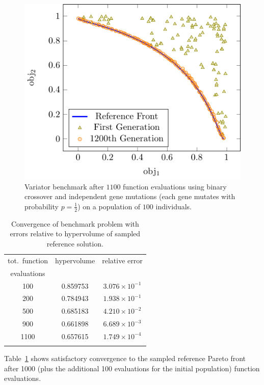 \begin{figure}
  \centering
    \includegraphics[width=0.6\linewidth]{figures/valid_front}
  \caption{Variator benchmark after $1100$ function evaluations using binary
           crossover and independent gene mutations (each gene mutates with
           probability $p=\frac{1}{2}$) on a population of $100$
           individuals.}
  \label{fig:pisa_bench}
\end{figure}

\begin{table}%
\begin{center}
  \caption{Convergence of benchmark problem with errors relative to
    hypervolume of sampled reference solution.}
  \label{tbl:bench_rms_error}
  \begin{tabular}{c|c|c}
    \hline\noalign{\smallskip}
    tot.\ function  & hypervolume & relative error\\
    evaluations    & & \\
    \noalign{\smallskip}\hline\noalign{\smallskip}
    100  &  0.859753 & $3.076 \times 10^{-1}$ \\
    200  &  0.784943 & $1.938 \times 10^{-1}$ \\
    500  &  0.685183 & $4.210 \times 10^{-2}$ \\
    900  &  0.661898 & $6.689 \times 10^{-3}$ \\
    1100 &  0.657615 & $1.749 \times 10^{-4}$ \\
    \noalign{\smallskip}\hline
  \end{tabular}
\end{center}
\end{table}

Table~\ref{tbl:bench_rms_error} shows satisfactory
  convergence to the sampled reference Pareto front after 1000 (plus the
  additional 100 evaluations for the initial population) function evaluations.



